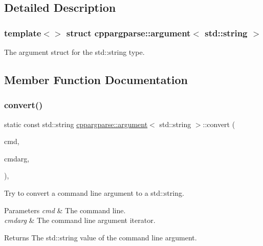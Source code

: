\subsection{Detailed Description}
\subsubsection*{template$<$$>$\newline
struct cppargparse\+::argument$<$ std\+::string $>$}

The argument struct for the std\+::string type. 

\subsection{Member Function Documentation}
\mbox{\label{structcppargparse_1_1argument_3_01std_1_1string_01_4_a97a68548d5ba012e551d2fb2de6083c2}} 
\subsubsection{\texorpdfstring{convert()}{convert()}}
{\footnotesize\ttfamily static const std\+::string \hyperlink{structcppargparse_1_1argument}{cppargparse\+::argument}$<$ std\+::string $>$\+::convert (\begin{DoxyParamCaption}\item[{const types\+::\+Command\+Line\+\_\+t \&}]{cmd,  }\item[{const types\+::\+Command\+Line\+Argument\+\_\+t \&}]{cmdarg,  }\item[{const types\+::\+Command\+Line\+Arguments\+Map\+\_\+t \&}]{ }\end{DoxyParamCaption})\hspace{0.3cm}{\ttfamily [inline]}, {\ttfamily [static]}}



Try to convert a command line argument to a std\+::string. 


\begin{DoxyParams}{Parameters}
{\em cmd} & The command line. \\
\hline
{\em cmdarg} & The command line argument iterator.\\
\hline
\end{DoxyParams}
\begin{DoxyReturn}{Returns}
The std\+::string value of the command line argument. 
\end{DoxyReturn}

